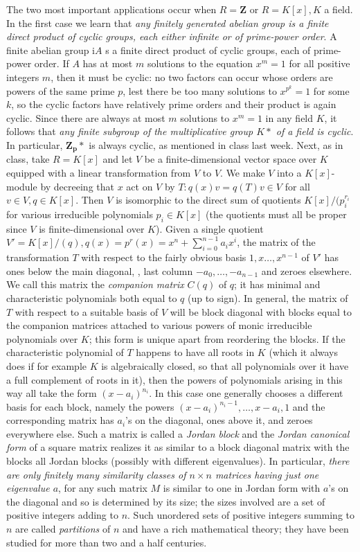 \documentclass[10pt]{article}
\begin{document}
The two most important applications occur when $R=\mathbf{Z}$ or
$R=K[x], K$ a field. In the first case we learn that {\sl any finitely
  generated abelian group is a finite direct product of cyclic groups,
  each either infinite or of prime-power order}. A finite abelian group
i$A$ s a finite direct product of cyclic groups, each of prime-power
order. If $A$ has at most $m$ solutions to the equation $x^m = 1$ for
all positive integers $m$, then it must be cyclic: no two factors can
occur whose orders are powers of the same prime $p$, lest there be too
many solutions to $x^{p^k}= 1$ for some $k$, so the cyclic factors have
relatively prime orders and their product is again cyclic. Since there
are always at most $m$ solutions to $x^m = 1$ in any field $K$, it
follows that {\sl any finite subgroup of the multiplicative group $K*$
  of a field is cyclic}. In particular, $\mathbf{Z_p}*$ is always
cyclic, as mentioned in class last week. Next, as in class, take
$R=K[x]$ and let $V$ be a finite-dimensional vector space over $K$
equipped with a linear transformation from $V$ to $V$. We make $V$ into
a $K[x]$-module by decreeing that $x$ act on $V$ by $T: q(x) v = q(T)
v\in V$ for all $v\in V, q\in K[x]$. Then $V$ is isomorphic to the
direct sum of quotients $K[x]/(p_i^{r_i}$ for various irreducible
polynomials $p_i\in K[x]$ (the quotients must all be proper since $V$ is
finite-dimensional over $K$). Given a single quotient $V'=K[x]/(q), q(x)
= p^r(x) = x^n + \sum_{i=0}^{n-1} a_i x^i$, the matrix of the
transformation $T$ with respect to the fairly obvious basis
$1,x\ldots,x^{n-1}$ of $V'$ has ones below the main diagonal, , last
column $-a_0,\ldots,-a_{n-1}$ and zeroes elsewhere. We call this matrix
the {\sl companion matrix} $C(q)$ of $q$; it has minimal and
characteristic polynomials both equal to $q$ (up to sign). In general,
the matrix of $T$ with respect to a suitable basis of $V$ will be block
diagonal with blocks equal to the companion matrices attached to various
powers of monic irreducible polynomials over $K$; this form is unique
apart from reordering the blocks. If the characteristic polynomial of
$T$ happens to have all roots in $K$ (which it always does if for
example $K$ is algebraically closed, so that all polynomials over it
have a full complement of roots in it), then the powers of polynomials
arising in this way all take the form $(x-a_i)^{n_i}$. In this case one
generally chooses a different basis for each block, namely the powers
$(x-a_i)^{n_i-1},\ldots,x-a_i,1$ and the corresponding matrix has
$a_i$'s on the diagonal, ones above it, and zeroes everywhere else. Such
a matrix is called a {\sl Jordan block} and the {\sl Jordan canonical
  form} of a square matrix realizes it as similar to a block diagonal
matrix with the blocks all Jordan blocks (possibly with different
eigenvalues). In particular, {\sl there are only finitely many
  similarity classes of $n\times n$ matrices having just one eigenvalue
  $a$}, for any such matrix $M$ is similar to one in Jordan form with
$a$'s on the diagonal and so is determined by its size; the sizes
involved are a set of positive integers adding to $n$. Such unordered
sets of positive integers summing to $n$ are called {\sl partitions} of
$n$ and have a rich mathematical theory; they have been studied for more
than two and a half centuries.
\end{document}
